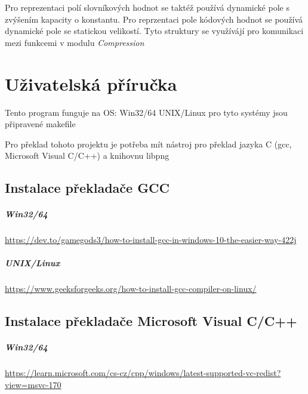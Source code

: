 \documentclass[12pt]{report}
\begin{document}
    Pro reprezentaci polí slovníkových hodnot se taktéž používá dynamické pole s zvýšením kapacity o konstantu.
    Pro reprzentaci pole kódových hodnot se používá dynamické pole se statickou velikostí.
    Tyto struktury se využívájí pro komunikaci mezi funkcemi v modulu \textit{Compression}



    \chapter{Uživatelská příručka}
    Tento program funguje na OS:
    Win32/64
    UNIX/Linux
    pro tyto systémy jsou připravené makefile

    Pro překlad tohoto projektu je potřeba mít nástroj pro překlad jazyka C (gcc, Microsoft Visual C/C++) a knihovnu libpng


    \section{Instalace překladače GCC}
    
\paragraph{Win32/64}
    \href{https://dev.to/gamegods3/how-to-install-gcc-in-windows-10-the-easier-way-422j}{https://dev.to/gamegods3/how-to-install-gcc-in-windows-10-the-easier-way-422j}
  
\paragraph{UNIX/Linux}
    \href{https://www.geeksforgeeks.org/how-to-install-gcc-compiler-on-linux/}{https://www.geeksforgeeks.org/how-to-install-gcc-compiler-on-linux/}


    \section{Instalace překladače Microsoft Visual C/C++}
    
\paragraph{Win32/64}

    \href{https://learn.microsoft.com/cs-cz/cpp/windows/latest-supported-vc-redist?view=msvc-170}{https://learn.microsoft.com/cs-cz/cpp/windows/latest-supported-vc-redist?view=msvc-170}
    
\end{document}
